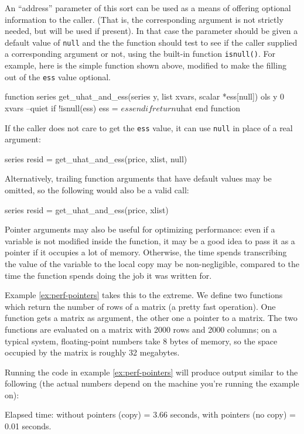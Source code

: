 An ``address'' parameter of this sort can be used as a means of
offering optional information to the caller.  (That is, the
corresponding argument is not strictly needed, but will be used if
present).  In that case the parameter should be given a default value
of \texttt{null} and the the function should test to see if the caller
supplied a corresponding argument or not, using the built-in function
\texttt{isnull()}.  For example, here is the simple function shown
above, modified to make the filling out of the \texttt{ess} value
optional.
%
\begin{code}
function series get_uhat_and_ess(series y, list xvars, scalar *ess[null])
  ols y 0 xvars --quiet
  if !isnull(ess) 
     ess = $ess
  endif
  return $uhat
end function
\end{code}
%
If the caller does not care to get the \texttt{ess} value, it can
use \texttt{null} in place of a real argument:
%
\begin{code}
series resid = get_uhat_and_ess(price, xlist, null)
\end{code}
%
Alternatively, trailing function arguments that have default values 
may be omitted, so the following would also be a valid call:
%
\begin{code}
series resid = get_uhat_and_ess(price, xlist)
\end{code}

Pointer arguments may also be useful for optimizing performance: even if
a variable is not modified inside the function, it may be a good idea
to pass it as a pointer if it occupies a lot of memory. Otherwise, the
time  spends transcribing the value of the variable to the
local copy may be non-negligible, compared to the time the function
spends doing the job it was written for.

Example \ref{ex:perf-pointers} takes this to the extreme.  We define
two functions which return the number of rows of a matrix (a pretty
fast operation).  One function gets a matrix as argument, the other
one a pointer to a matrix.  The two functions are evaluated on a
matrix with 2000 rows and 2000 columns; on a typical system,
floating-point numbers take 8 bytes of memory, so the space occupied
by the matrix is roughly 32 megabytes.

Running the code in example \ref{ex:perf-pointers} will produce output
similar to the following (the actual numbers depend on the
machine you're running the example on):
\begin{code}
Elapsed time: 
	without pointers (copy) = 3.66 seconds,
	with pointers (no copy) = 0.01 seconds.
\end{code}

